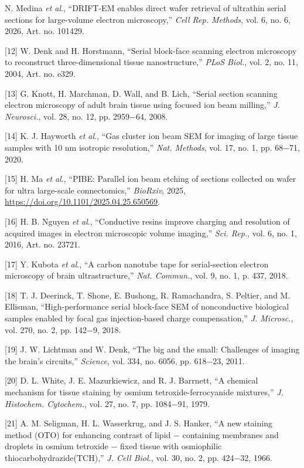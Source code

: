 \documentclass{article}
\begin{document}
\begin{hangpars}
[11] N. Medina \emph{et al}., “DRIFT-EM enables direct wafer retrieval of ultrathin serial sections for large-volume electron microscopy,” \emph{Cell Rep. Methods}, vol. 6, no. 6, 2026, Art. no. 101429.

[12] W. Denk and H. Horstmann, “Serial block-face scanning electron microscopy to reconstruct three-dimensional tissue nanostructure,” \emph{PLoS Biol.}, vol. 2, no. 11, 2004, Art. no. e329.

[13] G. Knott, H. Marchman, D. Wall, and B. Lich, “Serial section scanning electron microscopy of adult brain tissue using focused ion beam milling,” \emph{J. Neurosci.}, vol. 28, no. 12, pp. 2959−64, 2008.

[14] K. J. Hayworth \emph{et al}., “Gas cluster ion beam SEM for imaging of large tissue samples with 10 nm isotropic resolution,” \emph{Nat. Methods}, vol. 17, no. 1, pp. 68−71, 2020.

[15] H. Ma \emph{et al}., “PIBE: Parallel ion beam etching of sections collected on wafer for ultra large-scale connectomics,” \emph{BioRxiv}, 2025, \url{https://doi.org/10.1101/2025.04.25.650569}.

[16] H. B. Nguyen \emph{et al}., “Conductive resins improve charging and resolution of acquired images in electron microscopic volume imaging,” \emph{Sci. Rep.}, vol. 6, no. 1, 2016, Art. no. 23721.

[17] Y. Kubota \emph{et al}., “A carbon nanotube tape for serial-section electron microscopy of brain ultrastructure,” \emph{Nat. Commun.}, vol. 9, no. 1, p. 437, 2018.

[18] T. J. Deerinck, T. Shone, E. Bushong, R. Ramachandra, S. Peltier, and M. Ellisman, “High-performance serial block-face SEM of nonconductive biological samples enabled by focal gas injection-based charge compensation,” \emph{J. Microsc.}, vol. 270, no. 2, pp. 142−9, 2018.

[19] J. W. Lichtman and W. Denk, “The big and the small: Challenges of imaging the brain’s circuits,” \emph{Science}, vol. 334, no. 6056, pp. 618−23, 2011.

[20] D. L. White, J. E. Mazurkiewicz, and R. J. Barrnett, “A chemical mechanism for tissue staining by osmium tetroxide-ferrocyanide mixtures,” \emph{J. Histochem. Cytochem.}, vol. 27, no. 7, pp. 1084−91, 1979.

[21] A. M. Seligman, H. L. Wasserkrug, and J. S. Hanker, “A new staining method (OTO) for enhancing contrast of lipid − containing membranes and droplets in osmium tetroxide − fixed tissue with osmiophilic thiocarbohydrazide(TCH),” \emph{J. Cell Biol.}, vol. 30, no. 2, pp. 424−32, 1966.


\end{hangpars}
\end{document}

